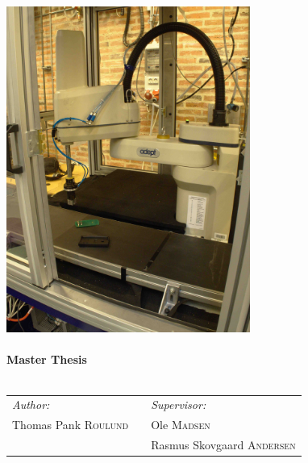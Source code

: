 \begin{titlepage}
\includegraphics[width=0.6\textwidth]{./forside/fronpage_test}
\\[0.4cm]
\HRule \\[0.4cm]
{ \bfseries Master Thesis }\\[0.2cm] %
\HRule \\[.4cm]

\vspace{1cm}
 



\begin{center}


\begin{tabular}{l p{5cm} l}


   
    \large \colorbox{white!30}{\emph{Author:}} && \large \colorbox{white!30}{\emph{Supervisor:}}\\[0.1cm]
   \large \colorbox{white!30}{Thomas Pank \textsc{Roulund}} && \large  \colorbox{white!30}{Ole \textsc{Madsen}} \\
     && \large  \colorbox{white!30}{Rasmus Skovgaard \textsc{Andersen}} \\
  

\end{tabular}
\end{center}
\end{titlepage}
